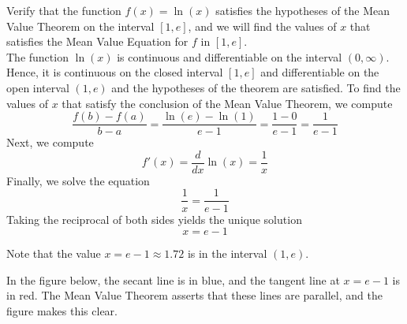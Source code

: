 \documentclass[handout]{ximera}
\begin{document}
\begin{example}[example 6]
Verify that the function $f(x) = \ln(x)$ satisfies the hypotheses of the Mean Value Theorem
on the interval $[1,e]$, and we will find the values of $x$ that satisfies the Mean Value Equation for $f$ in $[1,e]$.\\
The function $\ln(x)$ is continuous and differentiable on the interval $(0, \infty)$. 
Hence, it is continuous on the closed interval $[1, e]$ and differentiable on the open interval $(1, e)$ and the hypotheses of the theorem are satisfied.
To find the values of $x$ that satisfy the conclusion of the Mean Value Theorem, we compute
\[
\frac{f(b) - f(a)}{b-a} = \frac{\ln(e) - \ln(1)}{e-1} = \frac{1 - 0}{e-1} = \frac{1}{e-1}
\]
Next, we compute
\[f'(x) = \frac{d}{dx} \ln(x) = \frac{1}{x}\]
Finally, we solve the equation
\[\frac{1}{x} = \frac{1}{e-1}\]
Taking the reciprocal of both sides yields the unique solution
\[ x = e-1\]

Note that the value $x = e-1\approx 1.72$ is in the interval $(1,e)$.

In the figure below, the secant line is in blue, 
and the tangent line at $x = e-1$ is in red. 
The Mean Value Theorem asserts that these lines are parallel, and the figure
makes this clear.

\begin{image}
\end{image}


\end{example}
\end{document}
